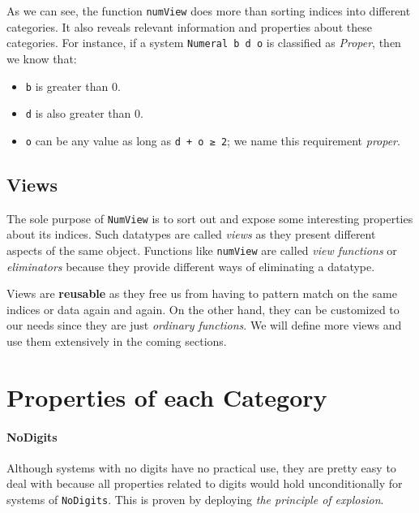 \documentclass[\main/thesis.tex]{subfiles}
\begin{document}
As we can see, the function {\lstinline|numView|} does more than sorting indices
into different categories. It also reveals relevant information and properties
about these categories. For instance, if a system {\lstinline|Numeral b d o|}
is classified as \textit{Proper}, then we know that:

\begin{itemize}
    \item {\lstinline|b|} is greater than $ 0 $.
    \item {\lstinline|d|} is also greater than $ 0 $.
    \item {\lstinline|o|} can be any value as long as {\lstinline|d + o ≥ 2|};
        we name this requirement \textit{proper}.
\end{itemize}

\subsection{Views}

The sole purpose of {\lstinline|NumView|} is to sort out and expose some
interesting properties about its indices.
Such datatypes are called \textit{views}\cite{wadler1987views} as they present
different aspects of the same object.
Functions like {\lstinline|numView|} are called \textit{view functions} or
\textit{eliminators}\cite{mcbride2004views} because they provide different ways
of eliminating a datatype.

Views are \textbf{reusable} as they free us from having to pattern match on the
same indices or data again and again. On the other hand, they can be customized
to our needs since they are just \textit{ordinary functions}.
We will define more views and use them extensively in the coming sections.

\section{Properties of each Category}

\paragraph{NoDigits}

Although systems with no digits have no practical use,
they are pretty easy to deal with because all properties related to digits would
hold unconditionally for systems of {\lstinline|NoDigits|}.
This is proven by deploying \textit{the principle of explosion}.
\end{document}
